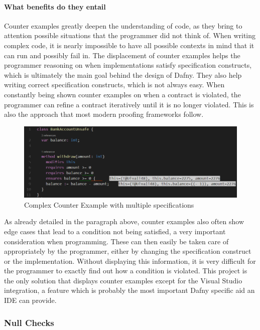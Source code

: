 \paragraph{What benefits do they entail}
Counter examples greatly deepen the understanding of code, as they bring to attention possible situations that the programmer did not think of. When writing complex code, it is nearly impossible to have all possible contexts in mind that it can run and possibly fail in. The displacement of counter examples helps the programmer reasoning on when implementations satisfy specification constructs, which is ultimately the main goal behind the design of Dafny. \newline
They also help writing correct specification constructs, which is not always easy. When constantly being shown counter examples on when a contract is violated, the programmer can refine a contract iteratively until it is no longer violated. This is also the approach that most modern proofing frameworks follow. \newline
\begin{figure}[H]
	\centering
	\includegraphics[width=1\textwidth]{img/counterModelBank}
	\caption{Complex Counter Example with multiple specifications}
	\label{fig:dfcounterModelBank}
\end{figure}
As already detailed in the paragraph above, counter examples also often show edge cases that lead to a condition not being satisfied, a very important consideration when programming. These can then easily be taken care of appropriately by the programmer, either by changing the specification construct or the implementation. Without displaying this information, it is very difficult for the programmer to exactly find out how a condition is violated. \newline
This project is the only solution that displays counter examples except for the Visual Studio integration, a feature which is probably the most important Dafny specific aid an IDE can provide. 
\subsubsection{Null Checks}
